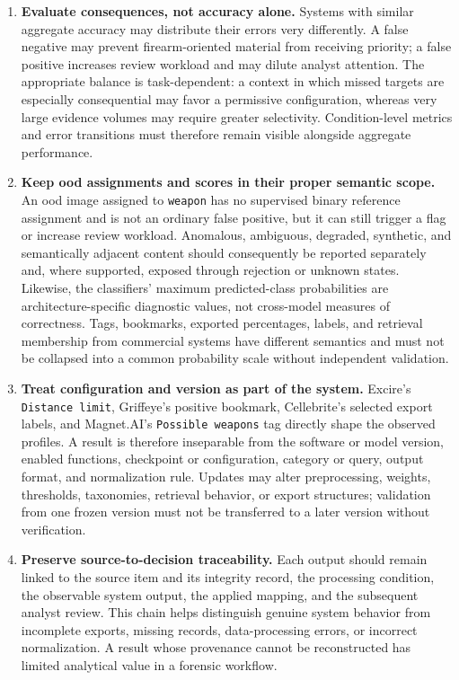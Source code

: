 \begin{enumerate}

\item \textbf{Evaluate consequences, not accuracy alone.}
Systems with similar aggregate accuracy may distribute their errors very
differently. A false negative may prevent firearm-oriented material from
receiving priority; a false positive increases review workload and may dilute
analyst attention. The appropriate balance is task-dependent: a context in
which missed targets are especially consequential may favor a permissive
configuration, whereas very large evidence volumes may require greater
selectivity. Condition-level metrics and error transitions must therefore
remain visible alongside aggregate performance.

\item \textbf{Keep \gls{ood} assignments and scores in their proper semantic
scope.}
An \gls{ood} image assigned to \texttt{weapon} has no supervised binary
reference assignment and is not an ordinary false positive, but it can still
trigger a flag or increase review workload. Anomalous, ambiguous, degraded,
synthetic, and semantically adjacent content should consequently be reported
separately and, where supported, exposed through rejection or unknown states.
Likewise, the classifiers' maximum predicted-class probabilities are
architecture-specific diagnostic values, not cross-model measures of
correctness. Tags, bookmarks, exported percentages, labels, and retrieval
membership from commercial systems have different semantics and must not be
collapsed into a common probability scale without independent validation.

\item \textbf{Treat configuration and version as part of the system.}
Excire's \texttt{Distance limit}, Griffeye's positive bookmark, Cellebrite's
selected export labels, and Magnet.AI's \texttt{Possible weapons} tag directly
shape the observed profiles. A result is therefore inseparable from the
software or model version, enabled functions, checkpoint or configuration,
category or query, output format, and normalization rule. Updates may alter
preprocessing, weights, thresholds, taxonomies, retrieval behavior, or export
structures; validation from one frozen version must not be transferred to a
later version without verification.

\item \textbf{Preserve source-to-decision traceability.}
Each output should remain linked to the source item and its integrity record,
the processing condition, the observable system output, the applied mapping,
and the subsequent analyst review. This chain helps distinguish genuine system
behavior from incomplete exports, missing records, data-processing errors, or
incorrect normalization. A result whose provenance cannot be reconstructed has
limited analytical value in a forensic workflow.

\end{enumerate}

